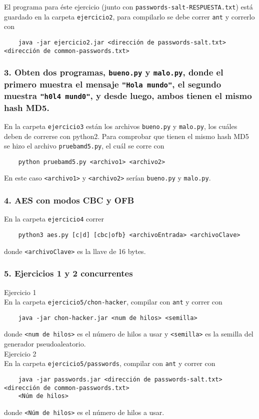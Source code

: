 \documentclass[14pt]{article}
\begin{document}
El programa para éste ejercicio (junto con \texttt{passwords-salt-RESPUESTA.txt}) está guardado en la carpeta \texttt{ejercicio2}, para compilarlo se debe correr \texttt{ant} y correrlo con
\begin{verbatim}
    java -jar ejercicio2.jar <dirección de passwords-salt.txt> <dirección de common-passwords.txt>
\end{verbatim}

\subsubsection*{3. Obten dos programas, \texttt{bueno.py} y \texttt{malo.py}, donde el primero muestra el mensaje \texttt{"Hola mundo"}, el segundo muestra \texttt{"h0l4 mund0"}, y desde luego, ambos tienen el mismo hash MD5.}
En la carpeta \texttt{ejercicio3} están los archivos \texttt{bueno.py} y \texttt{malo.py}, los cuáles deben de correrse con \textsf{python2}. Para comprobar que tienen el mismo hash MD5 se hizo el archivo \texttt{pruebamd5.py}, el cuál se corre con 
\begin{verbatim}
    python pruebamd5.py <archivo1> <archivo2>
\end{verbatim}
En este caso \texttt{<archivo1>} y \texttt{<archivo2>} serían \texttt{bueno.py} y \texttt{malo.py}.

\subsubsection*{4. AES con modos CBC y OFB}
En la carpeta \texttt{ejercicio4} correr
\begin{verbatim}
    python3 aes.py [c|d] [cbc|ofb} <archivoEntrada> <archivoClave>
\end{verbatim}
donde \texttt{<archivoClave>} es la llave de 16 bytes.

\subsubsection*{5. Ejercicios 1 y 2 concurrentes}
\textsf{Ejercicio 1} \\
En la carpeta \texttt{ejercicio5/chon-hacker}, compilar con \texttt{ant} y correr con
\begin{verbatim}
    java -jar chon-hacker.jar <num de hilos> <semilla>
\end{verbatim}
donde \texttt{<num de hilos>} es el número de hilos a usar y \texttt{<semilla>} es la semilla del generador pseudoaleatorio. \\

\textsf{Ejercicio 2} \\
En la carpeta \texttt{ejercicio5/passwords}, compilar con \texttt{ant} y correr con
\begin{verbatim}
    java -jar passwords.jar <dirección de passwords-salt.txt> <dirección de common-passwords.txt> 
    <Núm de hilos>
\end{verbatim}
donde \texttt{<Núm de hilos>} es el número de hilos a usar.
\end{document}
